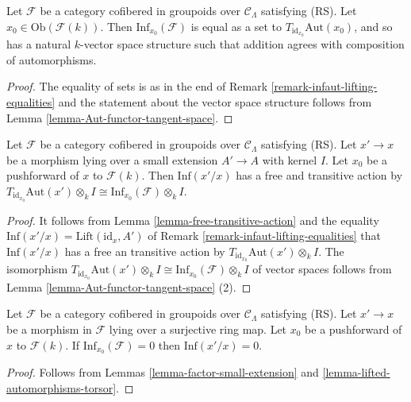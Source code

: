 \begin{lemma}
\label{lemma-infaut-vector-space}
Let $\mathcal{F}$ be a category cofibered in groupoids over $\mathcal 
C_\Lambda$ satisfying (RS).  Let $x_0 \in 
\text{Ob}(\mathcal{F}(k))$.  Then $\text{Inf}_{x_0}(\mathcal{F})$ is 
equal as a set to $T_{\text{id}_{x_0}} \text{Aut}(x_0)$, and so has 
a natural $k$-vector space structure such that addition agrees with composition 
of automorphisms.
\end{lemma}

\begin{proof}
The equality of sets is as in the end of Remark 
\ref{remark-infaut-lifting-equalities} and the statement about the vector space 
structure follows from Lemma \ref{lemma-Aut-functor-tangent-space}.
\end{proof} 

\begin{lemma}
\label{lemma-lifted-automorphisms-torsor}
Let $\mathcal{F}$ be a category cofibered in groupoids over $\mathcal 
C_\Lambda$ satisfying (RS).  Let $x' \to x$ be a 
morphism lying over a small extension $A' \to A$ with kernel $I$.  Let 
$x_0$ be a pushforward of $x$ to $\mathcal{F}(k)$.  Then 
$\text{Inf}(x'/x)$ has a free and transitive action by 
$T_{\text{id}_{x_0}} \text{Aut}(x') \otimes_{k} I \cong 
\text{Inf}_{x_0}(\mathcal{F}) \otimes_{k} I$.
\end{lemma}

\begin{proof}
It follows from Lemma \ref{lemma-free-transitive-action} and the equality 
$\text{Inf}(x'/x) = \text{Lift}(\text{id}_{x}, A')$ of Remark 
\ref{remark-infaut-lifting-equalities} that $\text{Inf}(x'/x)$ has a free 
an transitive action by $T_{\text{id}_{x_0}} \text{Aut}(x') 
\otimes_{k} I$.  The isomorphism $T_{\text{id}_{x_0}} 
\text{Aut}(x') \otimes_{k} I \cong \text{Inf}_{x_0}(\mathcal{F}) 
\otimes_{k} I$ of vector spaces follows from Lemma 
\ref{lemma-Aut-functor-tangent-space} (2).
\end{proof}

\begin{lemma}
\label{lemma-infaut-trivial}
Let $\mathcal{F}$ be a category cofibered in groupoids over $\mathcal 
C_\Lambda$ satisfying (RS). Let $x' \to x$ be a morphism 
in $\mathcal{F}$ lying over a surjective ring map.  Let $x_0$ be a pushforward 
of $x$ to $\mathcal{F}(k)$.  If $\text{Inf}_{x_0}(\mathcal{F}) = 0$ then 
$\text{Inf}(x'/x) = 0$.
\end{lemma}

\begin{proof}
Follows from Lemmas \ref{lemma-factor-small-extension} and 
\ref{lemma-lifted-automorphisms-torsor}.
\end{proof}

